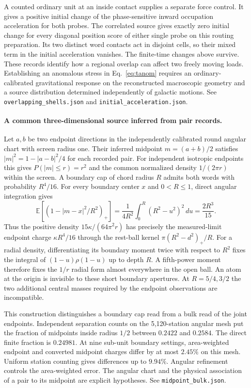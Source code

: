 \documentclass[11pt]{article}
\begin{document}
A counted ordinary unit at an inside contact supplies a separate force
control. It gives a positive initial change of the phase-sensitive
inward occupation acceleration for both probes. The correlated source
gives exactly zero initial change for every diagonal position score
of either single probe on this routing preparation. Its two distinct
word contacts act in disjoint cells, so their mixed term in the
initial acceleration vanishes. The finite-time changes above survive.
These records identify how a regional overlap can affect two freely
moving loads. Establishing an anomalous stress in
Eq.~\eqref{eq:tanom} requires an ordinary-calibrated gravitational
response on the reconstructed macroscopic geometry and a source
distribution determined independently of galactic motions.
See \texttt{overlapping\_shells.json} and
\texttt{initial\_acceleration.json}.

\paragraph{A common three-dimensional source inferred from pair records.}
Let \(a,b\) be two endpoint directions in the independently calibrated
round angular chart with screen radius one. Their inferred midpoint
\(m=(a+b)/2\) satisfies \(|m|^2=1-|a-b|^2/4\) for each recorded pair.
For independent isotropic endpoints this gives \(P(|m|\le r)=r^2\) and
the common normalized density \(1/(2\pi r)\) within the screen.
A boundary cap of chord radius \(R\) admits both words with probability
\(R^4/16\). For every boundary center \(x\) and \(0<R\le1\), direct
angular integration gives
\[
 \mathbb E[(1-|m-x|^2/R^2)_+]
 =\frac{1}{4R^2}\int_0^R(R^2-u^2)^2\,du=\frac{2R^3}{15}.
\]
Thus the positive density \(15\kappa/(64\pi^2 r)\) has precisely the
measured-limit endpoint charge \(\kappa R^4/16\) through the rest-ball
kernel \(\pi(R^2-d^2)_+/R\). For a radial density, differentiating its
boundary moment twice with respect to \(R^2\) fixes the integral of
\((1-u)\rho(1-u)\) up to depth \(R\). A fifth-power moment therefore
fixes the \(1/r\) radial form almost everywhere in the open ball.
An atom at the origin is invisible to these short boundary apertures.
At \(R=5/4,3/2\) the two additional central masses required by the
endpoint observations are incompatible.

This construction distinguishes a boundary cap read from a bulk read
of the joint endpoints. Independent separation counts on the
5,120-station angular mesh put the fraction of midpoints inside radius
\(1/2\) between \(0.2422\) and \(0.2584\). The direct finite fraction
is \(0.24981\). At nine sub-unit boundary settings, area-weighted
endpoint and converted midpoint charges differ by at most \(2.45\%\)
on this mesh. Uniform station counting gives differences up to
\(9.94\%\). Angular refinement controls the area-weighted error.
The angular chart and the physical association of a pair to its
midpoint are explicit hypotheses. See \texttt{midpoint\_bulk.json}.
\end{document}
